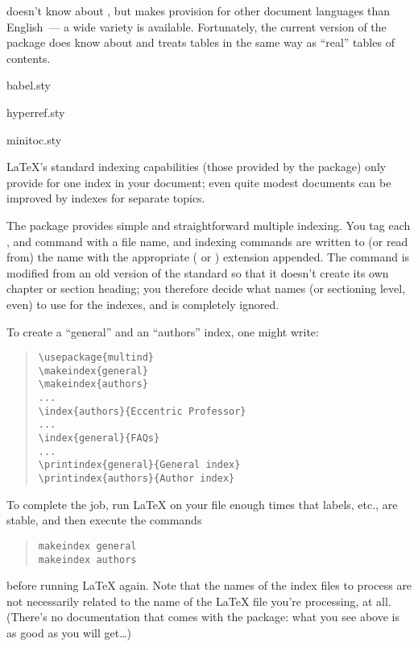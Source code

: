  doesn't know about , but
 makes provision for other document languages than
English~--- a wide variety is available.  Fortunately, the current
version of the  package does know about
 and treats  tables in the
same way as ``real'' tables of contents.
\begin{ctanrefs}
\item[babel.sty]
\item[hyperref.sty]
\item[minitoc.sty]
\end{ctanrefs}


\LaTeX{}'s standard indexing capabilities (those provided by the
 package) only provide for one index in your
document; even quite modest documents can be improved by indexes for
separate topics.

The  package provides simple and straightforward
multiple indexing.  You tag each ,  and
 command with a file name, and indexing commands are
written to (or read from) the name with the appropriate ( or
) extension appended.  The  command is modified
from an old version of the \LaTeXo{} standard so that it doesn't
create its own chapter or section heading; you therefore decide what
names (or sectioning level, even) to use for the indexes, and
 is completely ignored.

To create a ``general'' and an ``authors'' index, one might write:
\begin{quote}
\begin{verbatim}
\usepackage{multind}
\makeindex{general}
\makeindex{authors}
...
\index{authors}{Eccentric Professor}
...
\index{general}{FAQs}
...
\printindex{general}{General index}
\printindex{authors}{Author index}
\end{verbatim}
\end{quote}
To complete the job, run \LaTeX{} on your file enough times that
labels, etc., are stable, and then execute the commands
\begin{quote}
\begin{verbatim}
makeindex general
makeindex authors
\end{verbatim}
\end{quote}
before running \LaTeX{} again.  Note that the names of the index files
to process are not necessarily related to the name of the \LaTeX{}
file you're processing, at all.  (There's no documentation that comes
with the package: what you see above is as good as you will
get\dots{})

